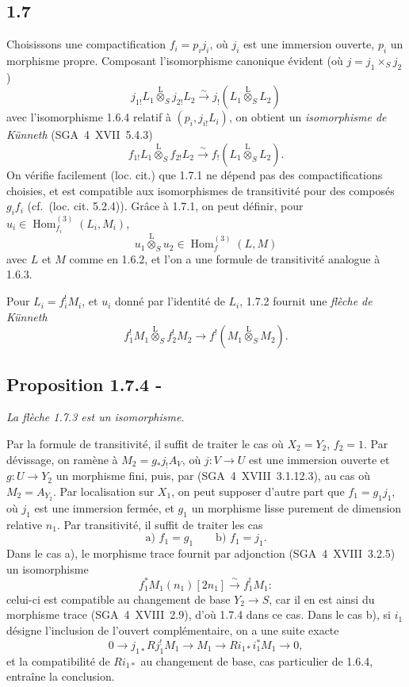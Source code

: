 \documentclass[11pt]{article}
\DeclareMathOperator{\Hom}{Hom}
\providecommand{\Hom}{\operatorname{Hom}}
\providecommand{\Hom}{\operatorname{Hom}}
\begin{document}
\subsection*{1.7}
Choisissons une compactification $f_i=p_i j_i$, où $j_i$ est une immersion ouverte, $p_i$ un morphisme propre. Composant l'isomorphisme canonique évident (où $j=j_1\times_S j_2$)
\[
j_{1!}L_1\overset{\mathrm{L}}{\otimes}_{S}j_{2!}L_2\xrightarrow{\sim}j_{!}(L_1\overset{\mathrm{L}}{\otimes}_{S}L_2)
\]
avec l'isomorphisme 1.6.4 relatif à $(p_i,j_{i!}L_i)$, on obtient un \emph{isomorphisme de Künneth} (SGA~4~XVII~5.4.3)
\begin{equation}\tag{1.7.1}
f_{1!}L_1\overset{\mathrm{L}}{\otimes}_{S}f_{2!}L_2\xrightarrow{\sim}f_{!}(L_1\overset{\mathrm{L}}{\otimes}_{S}L_2).
\end{equation}
On vérifie facilement (loc. cit.) que 1.7.1 ne dépend pas des compactifications choisies, et est compatible aux isomorphismes de transitivité pour des composés $g_if_i$ (cf.~(loc. cit. 5.2.4)). Grâce à 1.7.1, on peut définir, pour $u_i\in\Hom_{f_i}^{(3)}(L_i,M_i)$,
\begin{equation}\tag{1.7.2}
u_1\overset{\mathrm{L}}{\otimes}_{S}u_2\in\Hom_f^{(3)}(L,M)
\end{equation}
avec $L$ et $M$ comme en 1.6.2, et l'on a une formule de transitivité analogue à 1.6.3.

Pour $L_i=f_i^{!}M_i$, et $u_i$ donné par l'identité de $L_i$, 1.7.2 fournit une \emph{flèche de Künneth}
\begin{equation}\tag{1.7.3}
f_1^{!}M_1\overset{\mathrm{L}}{\otimes}_{S}f_2^{!}M_2\longrightarrow f^{!}(M_1\overset{\mathrm{L}}{\otimes}_{S}M_2).
\end{equation}

\subsection*{Proposition 1.7.4 -}
\emph{La flèche 1.7.3 est un isomorphisme}.

Par la formule de transitivité, il suffit de traiter le cas où $X_2=Y_2$, $f_2=1$. Par dévissage, on ramène à $M_2=g_{*}j_{!}A_V$, où $j:V\to U$ est une immersion ouverte et $g:U\to Y_2$ un morphisme fini, puis, par (SGA~4~XVIII~3.1.12.3), au cas où $M_2=A_{Y_2}$. Par localisation sur $X_1$, on peut supposer d'autre part que $f_1=g_1j_1$, où $j_1$ est une immersion fermée, et $g_1$ un morphisme lisse purement de dimension relative $n_1$. Par transitivité, il suffit de traiter les cas
\[
\text{a) } f_1=g_1\qquad \text{b) } f_1=j_1.
\]
Dans le cas a), le morphisme trace fournit par adjonction (SGA~4~XVIII~3.2.5) un isomorphisme
\[
f_1^{*}M_1(n_1)[2n_1]\xrightarrow{\sim}f_1^{!}M_1 :
\]
celui-ci est compatible au changement de base $Y_2\to S$, car il en est ainsi du morphisme trace (SGA~4~XVIII~2.9), d'où 1.7.4 dans ce cas. Dans le cas b), si $i_1$ désigne l'inclusion de l'ouvert complémentaire, on a une suite exacte
\[
0\longrightarrow j_{1*}Rj_1^{!}M_1\longrightarrow M_1\longrightarrow Ri_{1*}i_1^{*}M_1\longrightarrow0,
\]
et la compatibilité de $Ri_{1*}$ au changement de base, cas particulier de 1.6.4, entraîne la conclusion.
\end{document}
